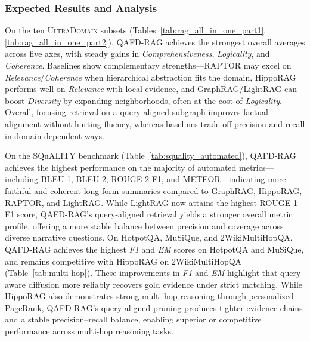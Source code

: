 \documentclass{article} %
\begin{document}
\subsubsection{Expected Results and Analysis}

On the ten \textsc{UltraDomain} subsets (Tables~\ref{tab:rag_all_in_one_part1}, \ref{tab:rag_all_in_one_part2}), {QAFD-RAG} achieves the strongest overall averages across five axes, with steady gains in \emph{Comprehensiveness}, \emph{Logicality}, and \emph{Coherence}. Baselines show complementary strengths—RAPTOR may excel on \emph{Relevance}/\emph{Coherence} when hierarchical abstraction fits the domain, HippoRAG performs well on \emph{Relevance} with local evidence, and GraphRAG/LightRAG can boost \emph{Diversity} by expanding neighborhoods, often at the cost of \emph{Logicality}. Overall, focusing retrieval on a query-aligned subgraph improves factual alignment without hurting fluency, whereas baselines trade off precision and recall in domain-dependent ways.



{
On the SQuALITY benchmark (Table~\ref{tab:squality_automated}), QAFD-RAG achieves the highest performance on the majority of automated metrics—including BLEU-1, BLEU-2, ROUGE-2 F1, and METEOR—indicating more faithful and coherent long-form summaries compared to GraphRAG, HippoRAG, RAPTOR, and LightRAG. 
While LightRAG now attains the highest ROUGE-1 F1 score, QAFD-RAG's query-aligned retrieval yields a stronger overall metric profile, offering a more stable balance between precision and coverage across diverse narrative questions.
On HotpotQA, {MuSiQue, and 2WikiMultiHopQA}, QAFD-RAG {achieves the highest \emph{F1} and \emph{EM} scores on HotpotQA and MuSiQue, and remains competitive with HippoRAG on 2WikiMultiHopQA} (Table~\ref{tab:multi-hop}). These improvements in \emph{F1} and \emph{EM} highlight that query-aware diffusion more reliably recovers gold evidence under strict matching. {While HippoRAG also demonstrates strong multi-hop reasoning through personalized PageRank, QAFD-RAG's} query-aligned pruning produces tighter evidence chains and a stable precision–recall balance, enabling {superior or competitive} performance across multi-hop reasoning tasks.
}
\end{document}
